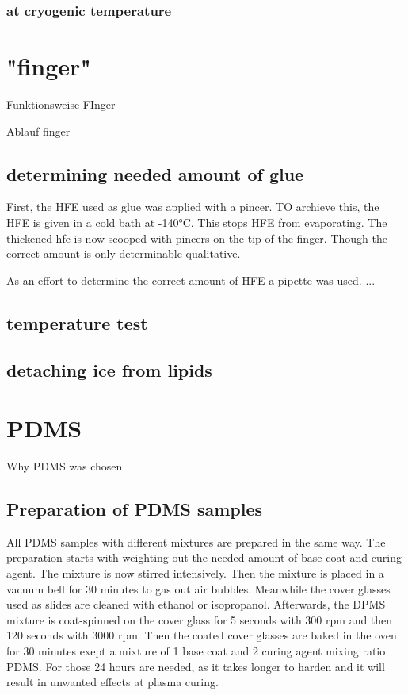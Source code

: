 \subsubsection{at cryogenic temperature}

\section{"finger"}

Funktionsweise FInger

Ablauf finger



\subsection{determining needed amount of glue}

First, the HFE used as glue was applied with a pincer. TO archieve this, the HFE is given in a cold bath at -140°C. This stops HFE from evaporating. The thickened hfe is now scooped with pincers on the tip of the finger. Though the correct amount is only determinable qualitative.

As an effort to determine the correct amount of HFE a pipette was used. ...



\subsection{temperature test}

\subsection{detaching ice from lipids}

\section{PDMS}

Why PDMS was chosen

\subsection{Preparation of PDMS samples}

All PDMS samples with different mixtures are prepared in the same way. The preparation starts with weighting out the needed amount of base coat and curing agent. The mixture is now stirred intensively. Then the mixture is placed in a vacuum bell for 30 minutes to gas out air bubbles. Meanwhile the cover glasses used as slides are cleaned with ethanol or isopropanol. Afterwards, the DPMS mixture is coat-spinned on the cover glass for 5 seconds with 300 rpm and then 120 seconds with 3000 rpm. Then the coated cover glasses are baked in the oven for 30 minutes exept a mixture of 1 base coat and 2 curing agent mixing ratio PDMS. For those 24 hours are needed, as it takes longer to harden and it will result in unwanted effects at plasma curing.

